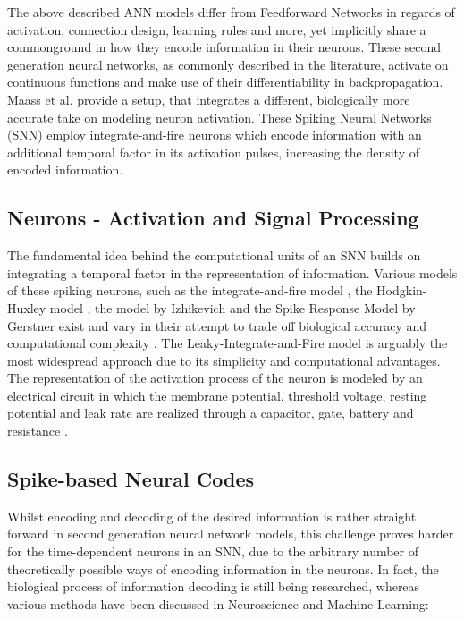 \documentclass[letterpaper, 10 pt, conference]{ieeeconf}  %
\begin{document}
The above described ANN models differ from Feedforward Networks in regards of activation, connection design, learning rules and more, yet implicitly
share a commonground in how they encode information in their neurons. These second generation neural networks, as commonly described in the literature,
activate on continuous functions and make use of their differentiability in backpropagation. Maass et al. \cite{maassNetworksSpikingNeurons1997} 
provide a setup, that
integrates a different, biologically more accurate take on modeling neuron activation. These Spiking Neural Networks (SNN) employ
integrate-and-fire neurons \cite{maassNetworksSpikingNeurons} which encode information with an additional temporal factor in its activation pulses, increasing
the density of encoded information.  

\subsection{Neurons - Activation and Signal Processing} 

The fundamental idea behind the computational units of an SNN builds on integrating a temporal factor 
in the representation of information. Various models of these spiking neurons, such as the integrate-and-fire model
 \cite{abbottLapicqueIntroductionIntegrateandfire1999}, 
the Hodgkin-Huxley model \cite{hodgkinQuantitativeDescriptionMembrane1952}, the model by Izhikevich \cite{izhikevichSimpleModelSpiking2003}
and the Spike Response Model by Gerstner \cite{gerstnerSpikeresponseModel2008}
exist and vary in their attempt to trade off biological accuracy and computational complexity \cite{gruningSpikingNeuralNetworks2014}.
The Leaky-Integrate-and-Fire model is arguably the most widespread approach due to its simplicity and computational advantages. 
The representation of the activation process of the neuron is modeled by an electrical circuit in which the membrane potential, threshold voltage,
resting potential and leak rate are realized through a capacitor, gate, battery and resistance
\cite{abbottLapicqueIntroductionIntegrateandfire1999}\cite{ponulakIntroductionSpikingNeural2011}.
\subsection{Spike-based Neural Codes}

Whilst encoding and decoding of the desired information is rather straight forward in second generation neural network models,
this challenge proves harder for the time-dependent neurons in an SNN, due to the arbitrary 
number of theoretically possible ways of encoding information in the neurons. In fact, the biological process of information decoding is 
still being researched, whereas various methods have been discussed in Neuroscience and Machine Learning:
\end{document}
